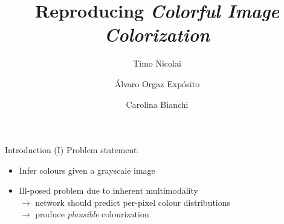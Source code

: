 \documentclass{beamer}
\title{Reproducing \textit{Colorful Image Colorization}}
\author{Timo Nicolai \and Álvaro Orgaz Expósito \and Carolina Bianchi}
\begin{document}
\begin{frame}
  \titlepage
\end{frame}


\begin{frame}{Introduction (I)}
  Problem statement:
    \begin{itemize}
      \item Infer colours given a grayscale image
      \item Ill-posed problem due to inherent multimodality \\
            $\rightarrow$ network should predict per-pixel colour distributions \\
            $\rightarrow$ produce \textit{plausible} colourization
    \end{itemize}

  \medskip


\end{frame}
\end{document}

